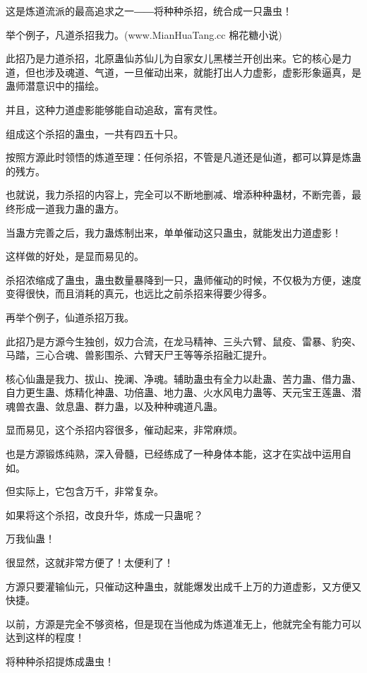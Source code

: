 
\begin{this_body}

这是炼道流派的最高追求之一――将种种杀招，统合成一只蛊虫！

举个例子，凡道杀招我力。(www.MianHuaTang.cc 棉花糖小说)

此招乃是力道杀招，北原蛊仙苏仙儿为自家女儿黑楼兰开创出来。它的核心是力道，但也涉及魂道、气道，一旦催动出来，就能打出人力虚影，虚影形象逼真，是蛊师潜意识中的描绘。

并且，这种力道虚影能够能自动追敌，富有灵性。

组成这个杀招的蛊虫，一共有四五十只。

按照方源此时领悟的炼道至理：任何杀招，不管是凡道还是仙道，都可以算是炼蛊的残方。

也就说，我力杀招的内容上，完全可以不断地删减、增添种种蛊材，不断完善，最终形成一道我力蛊的蛊方。

当蛊方完善之后，我力蛊炼制出来，单单催动这只蛊虫，就能发出力道虚影！

这样做的好处，是显而易见的。

杀招浓缩成了蛊虫，蛊虫数量暴降到一只，蛊师催动的时候，不仅极为方便，速度变得很快，而且消耗的真元，也远比之前杀招来得要少得多。

再举个例子，仙道杀招万我。

此招乃是方源今生独创，奴力合流，在龙马精神、三头六臂、鼠疫、雷暴、豹突、马踏，三心合魂、兽影围杀、六臂天尸王等等杀招融汇提升。

核心仙蛊是我力、拔山、挽澜、净魂。辅助蛊虫有全力以赴蛊、苦力蛊、借力蛊、自力更生蛊、炼精化神蛊、功倍蛊、地力蛊、火水风电力蛊等、天元宝王莲蛊、潜魂兽衣蛊、敛息蛊、群力蛊，以及种种魂道凡蛊。

显而易见，这个杀招内容很多，催动起来，非常麻烦。

也是方源锻炼纯熟，深入骨髓，已经练成了一种身体本能，这才在实战中运用自如。

但实际上，它包含万千，非常复杂。

如果将这个杀招，改良升华，炼成一只蛊呢？

万我仙蛊！

很显然，这就非常方便了！太便利了！

方源只要灌输仙元，只催动这种蛊虫，就能爆发出成千上万的力道虚影，又方便又快捷。

以前，方源是完全不够资格，但是现在当他成为炼道准无上，他就完全有能力可以达到这样的程度！

将种种杀招提炼成蛊虫！


\end{this_body}
